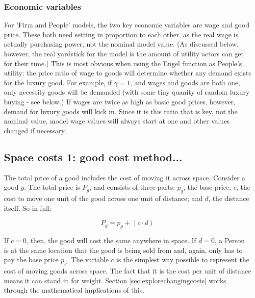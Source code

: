 \subsubsection{Economic variables}

For 'Firm and People' models, the two key economic variables are wage and good price. These both need setting in proportion to each other, as the real wage is actually purchasing power, not the nominal model value. (As discussed below, however, the real yardstick for the model is the amount of utility actors can get for their time.) This is most obvious when using the Engel function as People's utility: the price ratio of wage to goods will determine whether any demand exists for the luxury good. For example, if $\gamma=1$, and wages and goods are both one, only necessity goods will be demanded (with some tiny quanity of random luxury buying - see below.) If wages are twice as high as basic good prices, however, demand for luxury goods will kick in. Since it is this ratio that is key, not the nominal value, model wage values will always start at one and other values changed if necessary.

\subsection{Space costs 1: good cost method...\label{sec:spacecost1}}

The total price of a good includes the cost of moving it across space. Consider a good $g$. The total price is $P_g$, and consists of three parts: $p_g$, the base price; $c$, the cost to move one unit of the good across one unit of distance; and $d$, the distance itself. So in full:

\begin{equation}
P_g = p_g + (c \cdot d)
\label{eq:totalgoodcost}
\end{equation}

If $c = 0$, then, the good will cost the same anywhere in space. If $d = 0$, a Person is at the same location that the good is being sold from and, again, only has to pay the base price $p_g$. The variable $c$ is the simplest way possible to represent the cost of moving goods across space. The fact that it is the cost per unit of distance means it can stand in for weight. Section \ref{sec:explorechangingcosts} works through the mathematical implications of this.


